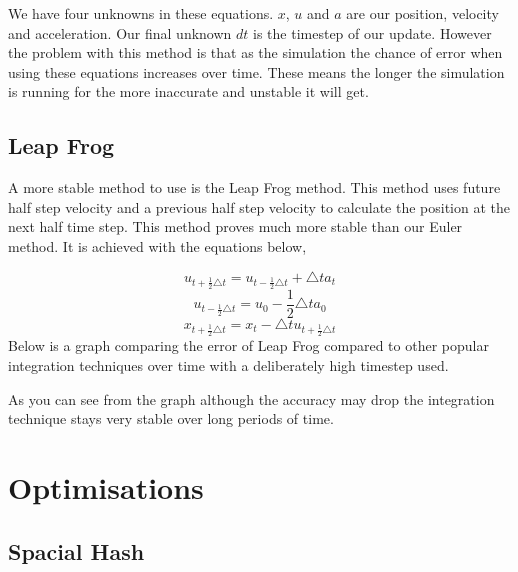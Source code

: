 We have four unknowns in these equations. $x$, $u$ and $a$ are our position, velocity and acceleration. Our final unknown $dt$ is the timestep of our update. However the problem with this method is that as the simulation the chance of error when using these equations increases over time. These means the longer the simulation is running for the more inaccurate and unstable it will get. \subsection*{Leap Frog }

A more stable method to use is the Leap Frog method. This method uses future half step velocity and a previous half step velocity to calculate the position at the next half time step. This method proves much more stable than our Euler method. It is achieved with the equations below,\par
 \[ u_{t+\frac{1}{2} \triangle t} = u_{t- \frac{1}{2} \triangle t} + \triangle t a_t \] \[ u_{t-\frac{1}{2} \triangle t} = u_0 - \frac{1}{2}\triangle t a_0 \] \[ x_{t+\frac{1}{2} \triangle t} = x_t - \triangle tu_{t+\frac{1}{2} \triangle t} \] Below is a graph comparing the error of Leap Frog compared to other popular integration techniques over time with a deliberately high timestep used.\par
As you can see from the graph although the accuracy may drop the integration technique stays very stable over long periods of time.

\section*{Optimisations }

\subsection*{Spacial Hash }

